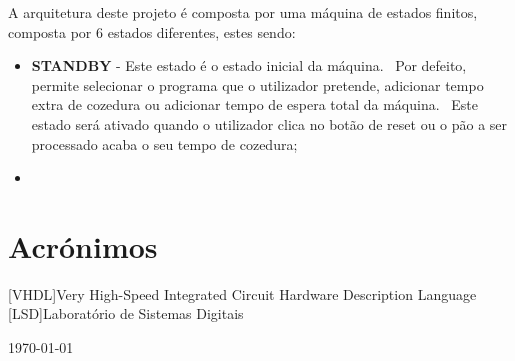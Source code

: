 \documentclass{article}
\begin{document}
    A arquitetura deste projeto é composta por uma máquina de estados finitos, composta por 6 estados diferentes, estes sendo:
    \begin{itemize}
        \item \textbf{STANDBY} - Este estado é o estado inicial da máquina. \ Por defeito, permite selecionar o programa que o utilizador pretende, adicionar tempo extra de cozedura ou adicionar tempo de espera total da máquina. \ Este estado será ativado quando o utilizador clica no botão de reset ou o pão a ser processado acaba o seu tempo de cozedura;
        \item \textbf{}
    \end{itemize}




    \newpage
    \section*{Acrónimos}
    \begin{acronym}
        [VHDL]{Very High-Speed Integrated Circuit Hardware Description Language}
        [LSD]{Laboratório de Sistemas Digitais}
    \end{acronym}

    \begin{flushright}
        \today
    \end{flushright}
\end{document}
